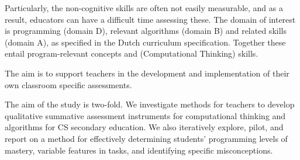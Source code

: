 Particularly, the non-cognitive skills are often not easily measurable, and as a result, educators can have a difficult time assessing these. The domain of interest is programming (domain D), relevant algorithms (domain B) and related skills (domain A), as specified in the Dutch curriculum specification. Together these entail program-relevant concepts and (Computational Thinking) skills.






The aim is to support teachers in the development and implementation of their own classroom specific assessments.


The aim of the study is two-fold. We investigate methods for teachers to develop qualitative summative assessment instruments for computational thinking and algorithms for CS secondary education. We also iteratively explore, pilot, and report on a method for effectively determining students' programming levels of mastery, variable features in tasks, and identifying specific misconceptions.









%


%



